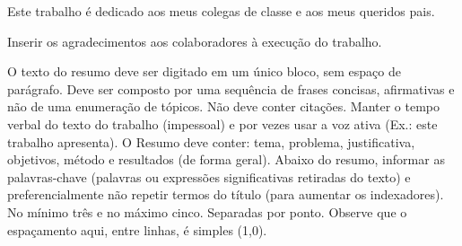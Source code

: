 \documentclass[
12pt,				%
oneside,			%
a4paper,			%
chapter=TITLE,		%
section=TITLE,		%
english,			%
brazil				%
hyperref=hidelinks]{abntex2}
\begin{document}
\imprimircapa

\imprimirfolhaderosto

\begin{folhadeaprovacao}
\end{folhadeaprovacao}

\begin{dedicatoria}
    Este trabalho é dedicado aos meus colegas de classe e aos meus queridos pais.
\end{dedicatoria}

\begin{agradecimentos}
    Inserir os agradecimentos aos colaboradores à execução do trabalho.
\end{agradecimentos}


\begin{resumo}
    O texto do resumo deve ser digitado em um único bloco, sem espaço de parágrafo. Deve ser composto por uma sequência de frases concisas, afirmativas e não de uma enumeração de tópicos. Não deve conter citações. Manter o tempo verbal do texto do trabalho (impessoal) e por vezes usar a voz ativa (Ex.: este trabalho apresenta). O Resumo deve conter: tema, problema, justificativa, objetivos, método e resultados (de forma geral). Abaixo do resumo, informar as palavras-chave (palavras ou expressões significativas retiradas do texto) e preferencialmente não repetir termos do título (para aumentar os indexadores). No mínimo três e no máximo cinco. Separadas por ponto. Observe que o espaçamento aqui, entre linhas, é simples (1,0).

\end{resumo}
\end{document}
